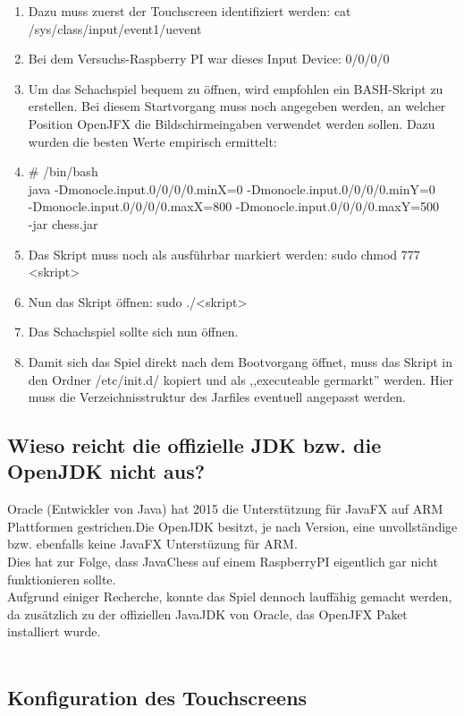 \documentclass[12pt,a4paper]{article}
\begin{document}
\begin{enumerate}
	\item{Dazu muss zuerst der Touchscreen identifiziert werden: cat /sys/class/input/event1/uevent}
	\item{Bei dem Versuchs-Raspberry PI war dieses Input Device: 0/0/0/0}
	\item{Um das Schachspiel bequem zu öffnen, wird empfohlen ein BASH-Skript zu erstellen. Bei diesem Startvorgang muss noch angegeben werden, an welcher Position OpenJFX die Bildschirmeingaben verwendet werden sollen. Dazu wurden die besten Werte empirisch ermittelt:}
	\item{\# /bin/bash \\
	java -Dmonocle.input.0/0/0/0.minX=0 -Dmonocle.input.0/0/0/0.minY=0 \\
	-Dmonocle.input.0/0/0/0.maxX=800 -Dmonocle.input.0/0/0/0.maxY=500 \\
	-jar chess.jar
	}
	\item{Das Skript muss noch als ausführbar markiert werden: sudo chmod 777 <skript>}
	\item{Nun das Skript öffnen: sudo ./<skript>}
	\item{Das Schachspiel sollte sich nun öffnen.}
	\item{Damit sich das Spiel direkt nach dem Bootvorgang öffnet, muss das Skript in den Ordner /etc/init.d/ kopiert und als ,,executeable germarkt'' werden. Hier muss die Verzeichnisstruktur des Jarfiles eventuell angepasst werden.}
\end{enumerate}

\newpage
\subsection{Wieso reicht die offizielle JDK bzw. die OpenJDK nicht aus?}

Oracle (Entwickler von Java) hat 2015 die Unterstützung für JavaFX auf \ac{ARM} Plattformen gestrichen.Die OpenJDK besitzt, je nach Version, eine unvollständige bzw. ebenfalls keine JavaFX Unterstüzung für ARM. \\
Dies hat zur Folge, dass JavaChess auf einem RaspberryPI eigentlich gar nicht funktionieren sollte. \\
Aufgrund einiger Recherche, konnte das Spiel dennoch lauffähig gemacht werden, da zusätzlich zu der offiziellen JavaJDK von Oracle, das OpenJFX Paket installiert wurde. \\
 \\


\subsection{Konfiguration des Touchscreens}
\label{SUBSEC:SCREENCONFIG}
\end{document}

